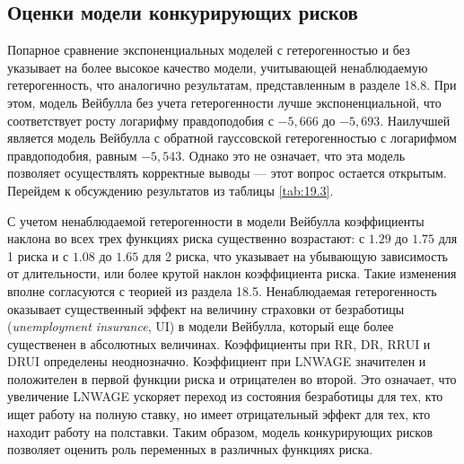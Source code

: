 \subsection{Оценки модели конкурирующих рисков}\label{sec:19.5.1}

\noindent
Попарное сравнение экспоненциальных моделей с гетерогенностью и без указывает на более высокое качество модели, учитывающей ненаблюдаемую гетерогенность, что аналогично результатам, представленным в разделе 18.8. %
При этом, модель Вейбулла без учета гетерогенности лучше экспоненциальной, что соответствует росту логарифму правдоподобия с $-5,666$ до $-5,693$. Наилучшей является модель Вейбулла с обратной гауссовской гетерогенностью с логарифмом правдоподобия, равным $-5,543$. Однако это не означает, что эта модель позволяет осуществлять корректные выводы --- этот вопрос остается открытым. Перейдем к обсуждению результатов из таблицы \ref{tab:19.3}.

С учетом ненаблюдаемой гетерогенности в модели Вейбулла коэффициенты наклона во всех трех функциях риска существенно возрастают: с $1.29$ до $1.75$ для 1 риска и с $1.08$ до $1.65$ для 2 риска, что указывает на убывающую зависимость от длительности, или более крутой наклон коэффициента риска. Такие изменения вполне согласуются с теорией из раздела 18.5. %
Ненаблюдаемая гетерогенность оказывает существенный эффект на величину страховки от безработицы (\textit{unemployment insurance}, UI) в модели Вейбулла, который еще более существенен в абсолютных величинах. Коэффициенты при RR, DR, RRUI и DRUI определены неоднозначно. Коэффициент при LNWAGE значителен и положителен в первой функции риска и отрицателен во второй. Это означает, что увеличение LNWAGE ускоряет переход из состояния безработицы для тех, кто ищет работу на полную ставку, но имеет отрицательный эффект для тех, кто находит работу на полставки. Таким образом, модель конкурирующих рисков позволяет оценить роль переменных в различных функциях риска.

